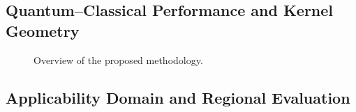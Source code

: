 \documentclass[conference]{IEEEtran}
\newif\ifdraftmode
\newcommand{\draftnote}[1]{%
  \ifdraftmode
    \par\noindent
    \colorbox{yellow!30}{\parbox{\dimexpr\columnwidth-2\fboxsep}{%
      \small\sffamily\textcolor{black!70}{#1}}}%
    \par\smallskip
  \fi
}
\begin{document}
\subsection{Quantum--Classical Performance and Kernel Geometry}
\label{sec:results-quantum}

\begin{figure}[t]
    \centering
    
    \caption{Overview of the proposed methodology.}
    \label{fig:methodology}
\end{figure}

\draftnote{%
\textbf{Preliminary values (replace with final):}\\
\textbullet\ DEVELOPMENT OOF AUROC — Product kernel:
   \textcolor{red}{[?.???]}\\
\textbullet\ DEVELOPMENT OOF AUROC — IQP-ZZ kernel:
   \textcolor{red}{[?.???]}\\
\textbullet\ DEVELOPMENT OOF AUROC — matched RBF:
   \textcolor{red}{[?.???]}\\
\textbullet\ Historical-holdout AUROC — Product:
   \textcolor{red}{[?.???]}\\
\textbullet\ Historical-holdout AUROC — IQP-ZZ:
   \textcolor{red}{[?.???]}\\
\textbullet\ Historical-holdout AUROC — RBF:
   \textcolor{red}{[?.???]}\\[4pt]
\textbf{Intended figure layout:}\\
Panel A: model AUROC.\\
Panel B: paired $\Delta$-AUROC relative to matched RBF.\\
Panel C: kernel geometry diagnostics.\\[4pt]
\textbf{Discuss:} centered kernel alignment; effective rank; eigenspectrum;
prediction disagreement; holdout behavior.\\[4pt]
\textbf{Intended narrative:}\\
small positive OOF difference $\to$
highly aligned kernel geometries $\to$
difference does not persist on historical holdout $\to$
no evidence of generalizable quantum advantage.\\[4pt]
\textbf{Do not:} claim quantum superiority, speedup, or hardware advantage.}

\subsection{Applicability Domain and Regional Evaluation}
\label{sec:results-ad}
\end{document}
